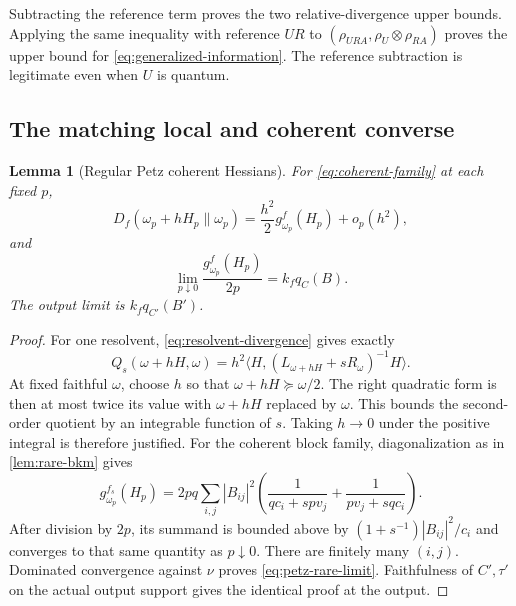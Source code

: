 \documentclass[11pt]{article}
\numberwithin{equation}{section}
\newtheorem{lemma}[theorem]{Lemma}
\theoremstyle{definition}
\theoremstyle{remark}
\newcommand{\ip}[2]{\langle #1,#2\rangle}
\begin{document}
Subtracting the reference term proves the two relative-divergence upper
bounds. Applying the same inequality with reference $UR$ to
$(\rho_{URA},\rho_U\otimes\rho_{RA})$ proves the upper bound for
\eqref{eq:generalized-information}. The reference subtraction is
legitimate even when $U$ is quantum.

\subsection{The matching local and coherent converse}

\begin{lemma}[Regular Petz coherent Hessians]
\label{lem:petz-hessian}
For \eqref{eq:coherent-family} at each fixed $p$,
\[
 D_f(\omega_p+hH_p\|\omega_p)
       =\frac{h^2}{2}g^f_{\omega_p}(H_p)+o_p(h^2),
\]
and
\begin{equation}
 \lim_{p\downarrow0}\frac{g^f_{\omega_p}(H_p)}{2p}
        =k_fq_C(B).
 \label{eq:petz-rare-limit}
\end{equation}
The output limit is $k_fq_{C'}(B')$.
\end{lemma}
\begin{proof}
For one resolvent, \eqref{eq:resolvent-divergence} gives exactly
\[
 Q_s(\omega+hH,\omega)
 =h^2\ip H{(L_{\omega+hH}+sR_\omega)^{-1}H}.
\]
At fixed faithful $\omega$, choose $h$ so that
$\omega+hH\succeq\omega/2$. The right quadratic form is then
at most twice its value with $\omega+hH$ replaced by $\omega$.
This bounds the second-order quotient by an integrable function of $s$.
Taking $h\to0$ under the positive integral is therefore justified.
For the coherent block family, diagonalization as in
\cref{lem:rare-bkm} gives
\begin{equation}
 g^{f_s}_{\omega_p}(H_p)
 =2pq\sum_{i,j}|B_{ij}|^2
   \left(\frac1{qc_i+spv_j}+
         \frac1{pv_j+sqc_i}\right).
 \label{eq:petz-hessian-exact}
\end{equation}
After division by $2p$, its summand is bounded above by
$(1+s^{-1})|B_{ij}|^2/c_i$ and converges to that same quantity
as $p\downarrow0$. There are finitely many $(i,j)$.
Dominated convergence against $\nu$ proves
\eqref{eq:petz-rare-limit}. Faithfulness of $C',\tau'$ on the actual
output support gives the identical proof at the output.
\end{proof}
\end{document}
